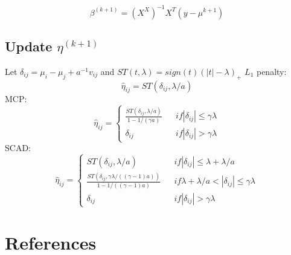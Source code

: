 \documentclass[review]{elsarticle}
\begin{document}
$$
\beta^{(k+1)}=(X^X)^{-1}X^T(y-\mu^{k+1})
$$
\subsection{Update $\eta^{(k+1)}$}
Let $\delta_{ij}=\mu_i-\mu_j+a^{-1}v_{ij}$ and $ST(t,\lambda)=sign(t)(|t|-\lambda)_+$
$L_1$ penalty:
$$\hat{\eta}_{ij}=ST(\delta_{ij},\lambda/a)$$
MCP:
$$
\hat{\eta}_{ij}=\left\{
\begin{array}{lcl}
\frac{ST(\delta_{ij},\lambda/a)}{1-1/(\gamma a)}&&if |\delta_{ij}|\leq \gamma\lambda\\
\delta_{ij}&&if |\delta_{ij}|>\gamma\lambda
\end{array}
\right.
$$
SCAD:
$$
\hat{\eta}_{ij}=\left\{
\begin{array}{lcl}
ST(\delta_{ij},\lambda/a)&&if|\delta_{ij}|\leq\lambda+\lambda/a\\
\frac{ST(\delta_{ij},\gamma\lambda/((\gamma-1)a))}{1-1/((\gamma-1)a)}&&if \lambda+\lambda/a<|\delta_{ij}|\leq \gamma\lambda\\
\delta_{ij}&&if |\delta_{ij}|>\gamma\lambda
\end{array}
\right.
$$
\section*{References}


\end{document}
